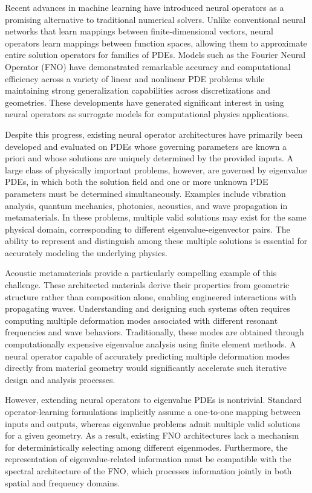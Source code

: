 \documentclass[preprint,review,12pt,numafflabel]{elsarticle}
\begin{document}
Recent advances in machine learning have introduced neural operators as a promising alternative to traditional numerical solvers. Unlike conventional neural networks that learn mappings between finite-dimensional vectors, neural operators learn mappings between function spaces, allowing them to approximate entire solution operators for families of PDEs. Models such as the Fourier Neural Operator (FNO) have demonstrated remarkable accuracy and computational efficiency across a variety of linear and nonlinear PDE problems while maintaining strong generalization capabilities across discretizations and geometries. These developments have generated significant interest in using neural operators as surrogate models for computational physics applications.

Despite this progress, existing neural operator architectures have primarily been developed and evaluated on PDEs whose governing parameters are known a priori and whose solutions are uniquely determined by the provided inputs. A large class of physically important problems, however, are governed by eigenvalue PDEs, in which both the solution field and one or more unknown PDE parameters must be determined simultaneously. Examples include vibration analysis, quantum mechanics, photonics, acoustics, and wave propagation in metamaterials. In these problems, multiple valid solutions may exist for the same physical domain, corresponding to different eigenvalue-eigenvector pairs. The ability to represent and distinguish among these multiple solutions is essential for accurately modeling the underlying physics.

Acoustic metamaterials provide a particularly compelling example of this challenge. These architected materials derive their properties from geometric structure rather than composition alone, enabling engineered interactions with propagating waves. Understanding and designing such systems often requires computing multiple deformation modes associated with different resonant frequencies and wave behaviors. Traditionally, these modes are obtained through computationally expensive eigenvalue analysis using finite element methods. A neural operator capable of accurately predicting multiple deformation modes directly from material geometry would significantly accelerate such iterative design and analysis processes.

However, extending neural operators to eigenvalue PDEs is nontrivial. Standard operator-learning formulations implicitly assume a one-to-one mapping between inputs and outputs, whereas eigenvalue problems admit multiple valid solutions for a given geometry. As a result, existing FNO architectures lack a mechanism for deterministically selecting among different eigenmodes. Furthermore, the representation of eigenvalue-related information must be compatible with the spectral architecture of the FNO, which processes information jointly in both spatial and frequency domains.
\end{document}
